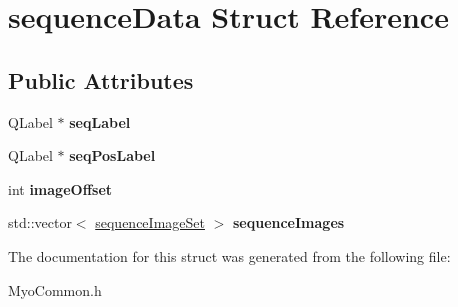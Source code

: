\hypertarget{structsequence_data}{\section{sequence\+Data Struct Reference}
\label{structsequence_data}
}
\subsection*{Public Attributes}
\begin{DoxyCompactItemize}
\item 
\hypertarget{structsequence_data_a2c1a2ac21a0d7dd02848765d10b4cba3}{Q\+Label $\ast$ {\bfseries seq\+Label}}\label{structsequence_data_a2c1a2ac21a0d7dd02848765d10b4cba3}

\item 
\hypertarget{structsequence_data_ad3c34c1b6cd3bc35fb2c1bc927d4c382}{Q\+Label $\ast$ {\bfseries seq\+Pos\+Label}}\label{structsequence_data_ad3c34c1b6cd3bc35fb2c1bc927d4c382}

\item 
\hypertarget{structsequence_data_a95768a03bf6b9968437b2bcd79e5e44a}{int {\bfseries image\+Offset}}\label{structsequence_data_a95768a03bf6b9968437b2bcd79e5e44a}

\item 
\hypertarget{structsequence_data_a5ddb69cc1337741e51e7028eb34df87f}{std\+::vector$<$ \hyperlink{structsequence_image_set}{sequence\+Image\+Set} $>$ {\bfseries sequence\+Images}}\label{structsequence_data_a5ddb69cc1337741e51e7028eb34df87f}

\end{DoxyCompactItemize}


The documentation for this struct was generated from the following file\+:\begin{DoxyCompactItemize}
\item 
Myo\+Common.\+h\end{DoxyCompactItemize}

